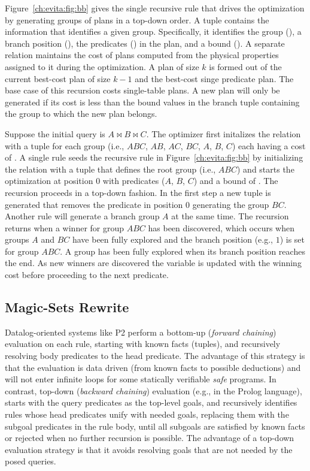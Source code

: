 Figure~\ref{ch:evita:fig:bb} gives the single recursive rule that drives the optimization by generating groups of plans in a top-down
order. A  tuple contains the information that identifies a given group. Specifically, it identifies
the group (), a branch position (), the predicates () in the plan, and a
bound (). A separate  relation maintains the cost of plans computed from the
physical properties assigned to it during the optimization. A plan of size $k$ is formed out of the current
best-cost plan of size $k - 1$ and the best-cost singe predicate plan. The base case of this
recursion costs single-table plans. A new plan will only be generated if its cost is less than the bound
values in the branch tuple containing the group to which the new plan belongs. 

Suppose the initial query is $A \Join B \Join C$. The optimizer first initalizes the  relation
with a tuple for each group (i.e., $ABC$, $AB$, $AC$, $BC$, $A$, $B$, $C$) each having a cost
of . A single rule seeds the recursive rule  in Figure~\ref{ch:evita:fig:bb} by initializing
the  relation with a tuple that defines the root group (i.e., $ABC$) and starts the optimization
at position $0$ with predicates ($A$, $B$, $C$) and a bound of . The recursion proceeds in a
top-down fashion. In the first step a new  tuple is generated that removes the predicate in position $0$
generating the group $BC$. Another rule will generate a branch group $A$ at the same time. The recursion returns
when a winner for group $ABC$ has been discovered, which occurs when groups $A$ and $BC$ have been fully
explored and the  branch position (e.g., $1$) is set for group $ABC$. A group has been fully explored when its 
branch position reaches the end. As new winners are discovered the  variable is updated with the
winning cost before proceeding to the next predicate. 

\subsection{Magic-Sets Rewrite}
\label{ch:evita:sec:magic}

Datalog-oriented systems like P2 perform a bottom-up (\emph{forward chaining}) evaluation 
on each rule, starting with known facts (tuples), and recursively resolving body predicates to the 
head predicate. The advantage of this strategy is that the evaluation is data driven (from known facts 
to possible deductions) and will not enter infinite loops for some statically verifiable \emph{safe} programs. 
In contrast, top-down (\emph{backward chaining}) evaluation (e.g., in the Prolog language), 
starts with the query predicates as the top-level goals, and recursively identifies rules whose head predicates 
unify with needed goals, replacing them with the subgoal predicates in the rule body, until all subgoals are 
satisfied by known facts or rejected when no further recursion is possible. The advantage of a top-down evaluation 
strategy is that it avoids resolving goals that are not needed by the posed queries.

